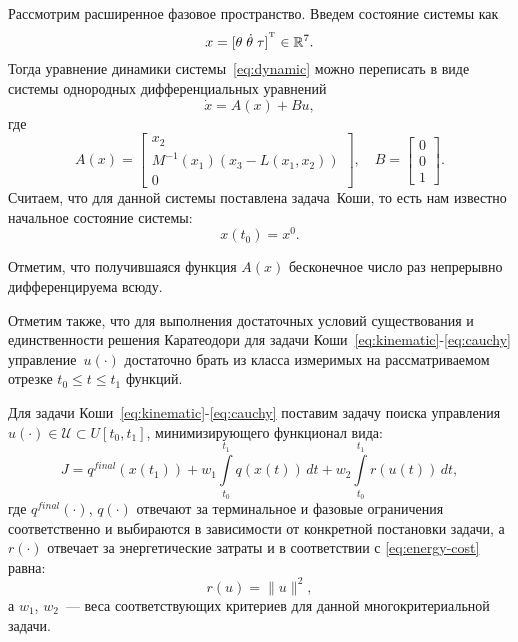 Рассмотрим расширенное фазовое пространство.
Введем состояние системы как
$$
    x = [\theta\;\dot\theta\;\tau]^{^\mathrm{T}} \in \mathbb{R}^7.
$$
Тогда уравнение динамики системы~\eqref{eq:dynamic} можно переписать в виде системы однородных дифференциальных уравнений
\begin{equation}\label{eq:kinematic}
    \dot x = A(x) + Bu,
\end{equation}
где 
$$
    A(x) = \left[\begin{aligned}
        x_2 \\
        M^{-1}(x_1)(x_3 - L(x_1, x_2)) \\
        0
    \end{aligned}\right]
    ,\quad
    B = \left[\begin{aligned}
        0 \\
        0 \\
        1
    \end{aligned}\right].
$$
Считаем, что для данной системы поставлена задача~Коши, то есть нам известно начальное состояние системы:
\begin{equation}\label{eq:cauchy}
    x(t_0) = x^0.
\end{equation}
\begin{remark}
    Отметим, что получившаяся функция $A(x)$ бесконечное число раз непрерывно дифференцируема всюду.
\end{remark}
\begin{remark}
    Отметим также, что для выполнения достаточных условий существования и единственности решения Каратеодори для задачи Коши~\eqref{eq:kinematic}-\eqref{eq:cauchy} управление~$u(\cdot)$ достаточно брать из класса измеримых на рассматриваемом отрезке $t_0\leqslant t \leqslant t_1$ функций.
\end{remark}

Для задачи Коши~\eqref{eq:kinematic}-\eqref{eq:cauchy} поставим задачу поиска управления $u(\cdot) \in \mathcal{U} \subset U[t_0,t_1]$, минимизирующего функционал вида:
\begin{equation}\label{eq:continuos-cost}
    J = q^{final}(x(t_1)) + w_1\int\limits_{t_0}^{t_1} q(x(t))\,dt + w_2\int\limits_{t_0}^{t_1} r(u(t))\,dt,
\end{equation}
где $q^{final}(\cdot)$, $q(\cdot)$ отвечают за терминальное и фазовые ограничения соответственно и выбираются в зависимости от конкретной постановки задачи, а $r(\cdot)$ отвечает за энергетические затраты и в соответствии с \eqref{eq:energy-cost} равна:
$$
    r(u) = \|u\|^2,
$$
а $w_1$, $w_2$~--- веса соответствующих критериев для данной многокритериальной задачи.


